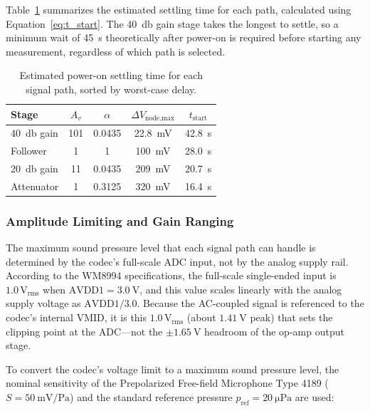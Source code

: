 Table~\ref{tab:startup_delays} summarizes the estimated settling time for each path, calculated using Equation~\ref{eq:t_start}. The \SI{40}{\decibel} gain stage takes the longest to settle, so a minimum wait of \SI{45}{\second} theoretically after power-on is required before starting any measurement, regardless of which path is selected.

\begin{table}[h!]
\centering
\begin{tabular}{|l|c|c|c|c|}
\hline
\textbf{Stage} & $A_v$ & $\alpha$ & $\Delta V_{\text{node,max}}$ & $t_{\text{start}}$ \\
\hline
\SI{40}{\decibel} gain & 101   & 0.0435 & \SI{22.8}{\milli\volt} & \SI{42.8}{\second} \\ \hline
Follower               & 1     & 1      & \SI{100}{\milli\volt}  & \SI{28.0}{\second} \\ \hline
\SI{20}{\decibel} gain & 11    & 0.0435 & \SI{209}{\milli\volt}  & \SI{20.7}{\second} \\ \hline
Attenuator             & 1     & 0.3125 & \SI{320}{\milli\volt}  & \SI{16.4}{\second} \\
\hline
\end{tabular}
\caption{Estimated power-on settling time for each signal path, sorted by worst-case delay.}
\label{tab:startup_delays}
\end{table}


\subsubsection{Amplitude Limiting and Gain Ranging}
The maximum sound pressure level that each signal path can handle is determined by the codec’s full-scale ADC input, not by the analog supply rail. According to the WM8994 specifications, the full-scale single-ended input is $1.0\,\mathrm{V_{rms}}$ when $\mathrm{AVDD1} = \SI{3.0}{\volt}$, and this value scales linearly with the analog supply voltage as $\mathrm{AVDD1}/3.0$. Because the AC-coupled signal is referenced to the codec’s internal VMID, it is this $1.0\,\mathrm{V_{rms}}$ (about $\SI{1.41}{\volt}$ peak) that sets the clipping point at the ADC—not the $\pm\SI{1.65}{\volt}$ headroom of the op-amp output stage.

To convert the codec’s voltage limit to a maximum sound pressure level, the nominal sensitivity of the Prepolarized Free-field Microphone Type 4189 ($S = \SI{50}{\milli\volt\per\pascal}$) and the standard reference pressure $p_{\text{ref}} = \SI{20}{\micro\pascal}$ are used:

